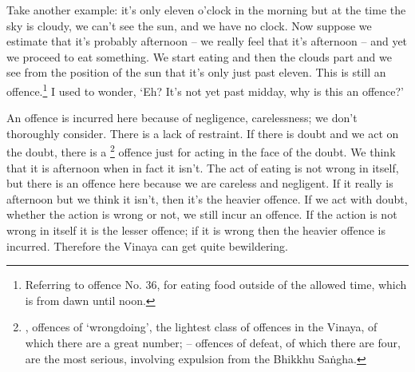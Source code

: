 Take another example: it's only eleven o'clock in the morning but at the time the sky is cloudy, we can't see the sun, and we have no clock. Now suppose we estimate that it's probably afternoon -- we really feel that it's afternoon -- and yet we proceed to eat something. We start eating and then the clouds part and we see from the position of the sun that it's only just past eleven. This is still an offence.\footnote{Referring to  offence No. 36, for eating food outside of the allowed time, which is from dawn until noon.} I used to wonder, `Eh? It's not yet past midday, why is this an offence?'

An offence is incurred here because of negligence, carelessness; we don't thoroughly consider. There is a lack of restraint. If there is doubt and we act on the doubt, there is a \footnote{, offences of `wrongdoing', the lightest class of offences in the Vinaya, of which there are a great number;  -- offences of defeat, of which there are four, are the most serious, involving expulsion from the Bhikkhu Sa\.ngha. } offence just for acting in the face of the doubt. We think that it is afternoon when in fact it isn't. The act of eating is not wrong in itself, but there is an offence here because we are careless and negligent. If it really is afternoon but we think it isn't, then it's the heavier  offence. If we act with doubt, whether the action is wrong or not, we still incur an offence. If the action is not wrong in itself it is the lesser offence; if it is wrong then the heavier offence is incurred. Therefore the Vinaya can get quite bewildering.


